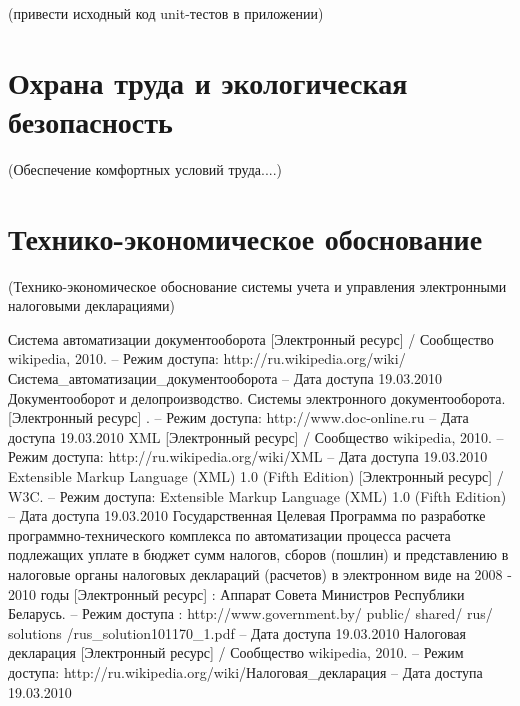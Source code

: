 \documentclass[14pt,a4paper]{reportmod}
\begin{document}
(привести исходный код unit-тестов в приложении)

\chapter*{Охрана труда и экологическая безопасность}
(Обеспечение комфортных условий труда....)


\chapter*{Технико-экономическое обоснование}
(Технико-экономическое обоснование системы учета и управления электронными налоговыми декларациями)


\begin{thebibliography}{99}

 Система автоматизации документооборота [Электронный ресурс] / Сообщество wikipedia, 2010. -- Режим доступа: http://ru.wikipedia.org/wiki/Система\_автоматизации\_документооборота -- Дата доступа 19.03.2010
 Документооборот и делопроизводство. Системы электронного документооборота. [Электронный ресурс] . -- Режим доступа: http://www.doc-online.ru -- Дата доступа 19.03.2010
 XML [Электронный ресурс] / Сообщество wikipedia, 2010. -- Режим доступа: http://ru.wikipedia.org/wiki/XML -- Дата доступа 19.03.2010
 Extensible Markup Language (XML) 1.0 (Fifth Edition) [Электронный ресурс] / W3C. -- Режим доступа: Extensible Markup Language (XML) 1.0 (Fifth Edition) -- Дата доступа 19.03.2010
 Государственная Целевая Программа по разработке программно-технического комплекса по автоматизации процесса расчета подлежащих уплате в бюджет сумм налогов, сборов (пошлин) и представлению в налоговые органы налоговых деклараций (расчетов) в электронном виде на 2008 - 2010 годы [Электронный ресурс] : Аппарат Совета Министров Республики Беларусь. -- Режим доступа : http://www.government.by/ public/ shared/ rus/ solutions /rus\_solution101170\_1.pdf -- Дата доступа 19.03.2010
 Налоговая декларация [Электронный ресурс] / Сообщество wikipedia, 2010. -- Режим доступа: http://ru.wikipedia.org/wiki/Налоговая\_декларация -- Дата доступа 19.03.2010

\end{thebibliography}
\end{document}
